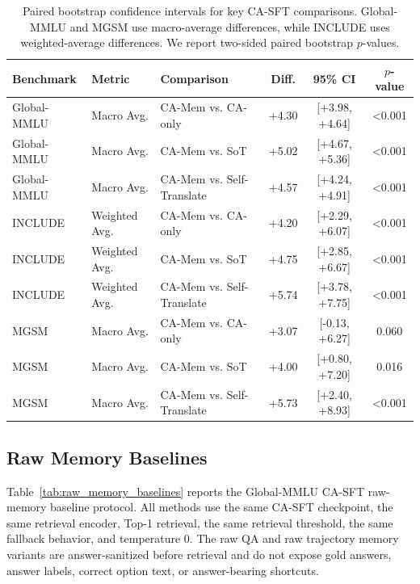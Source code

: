 \documentclass[11pt]{article}
\begin{document}
\begin{table}[t]
\centering
\scriptsize
\setlength{\tabcolsep}{3pt}
\renewcommand{\arraystretch}{0.95}
\begin{tabular*}{\textwidth}{@{\extracolsep{\fill}} l l l c c c}
\hline
Benchmark & Metric & Comparison & Diff. & 95\% CI & $p$-value \\
\hline
Global-MMLU & Macro Avg. & CA-Mem vs. CA-only & +4.30 & [+3.98, +4.64] & <0.001 \\
Global-MMLU & Macro Avg. & CA-Mem vs. SoT & +5.02 & [+4.67, +5.36] & <0.001 \\
Global-MMLU & Macro Avg. & CA-Mem vs. Self-Translate & +4.57 & [+4.24, +4.91] & <0.001 \\
INCLUDE & Weighted Avg. & CA-Mem vs. CA-only & +4.20 & [+2.29, +6.07] & <0.001 \\
INCLUDE & Weighted Avg. & CA-Mem vs. SoT & +4.75 & [+2.85, +6.67] & <0.001 \\
INCLUDE & Weighted Avg. & CA-Mem vs. Self-Translate & +5.74 & [+3.78, +7.75] & <0.001 \\
MGSM & Macro Avg. & CA-Mem vs. CA-only & +3.07 & [-0.13, +6.27] & 0.060 \\
MGSM & Macro Avg. & CA-Mem vs. SoT & +4.00 & [+0.80, +7.20] & 0.016 \\
MGSM & Macro Avg. & CA-Mem vs. Self-Translate & +5.73 & [+2.40, +8.93] & <0.001 \\
\hline
\end{tabular*}
\caption{Paired bootstrap confidence intervals for key CA-SFT comparisons. Global-MMLU and MGSM use macro-average differences, while INCLUDE uses weighted-average differences. We report two-sided paired bootstrap $p$-values.}
\label{tab:bootstrap_ci}
\end{table}

\subsection{Raw Memory Baselines}
Table~\ref{tab:raw_memory_baselines} reports the Global-MMLU CA-SFT raw-memory baseline protocol.
All methods use the same CA-SFT checkpoint, the same retrieval encoder, Top-1 retrieval, the same retrieval threshold, the same fallback behavior, and temperature 0.
The raw QA and raw trajectory memory variants are answer-sanitized before retrieval and do not expose gold answers, answer labels, correct option text, or answer-bearing shortcuts.
\end{document}

